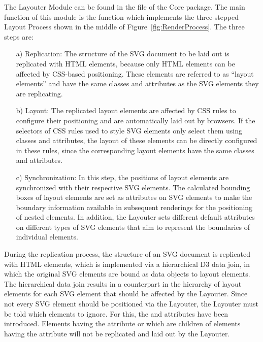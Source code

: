 The Layouter Module can be found in the  file of the
Core package. The main function of this module is the
 function which implements the three-stepped
Layout Process shown in the middle of
Figure~\ref{fig:RenderProcess}. The three steps are:
\begin{enumerate}
\item[a)] Replication: The structure of the SVG document to be laid
  out is replicated with HTML  elements, because only
  HTML elements can be affected by CSS-based positioning. These
  elements are referred to as \enquote{layout elements} and have the
  same classes and  attributes as the SVG elements
  they are replicating.

\item[b)] Layout: The replicated layout elements are affected by CSS
  rules to configure their positioning and are automatically laid out
  by browsers. If the selectors of CSS rules used to style SVG
  elements only select them using classes and 
  attributes, the layout of these elements can be directly configured
  in these rules, since the corresponding layout elements have the
  same classes and  attributes.

\item[c)] Synchronization: In this step, the positions of layout
  elements are synchronized with their respective SVG elements. The
  calculated bounding boxes of layout elements are set as
   attributes on SVG elements to make the boundary
  information available in subsequent renderings for the positioning
  of nested elements. In addition, the Layouter sets different default
  attributes on different types of SVG elements that aim to represent
  the boundaries of individual elements.
\end{enumerate}


During the replication process, the structure of an SVG document is
replicated with HTML  elements, which is implemented via
a hierarchical D3 data join, in which the original SVG elements are
bound as data objects to layout elements. The hierarchical data join
results in a counterpart in the hierarchy of layout elements for each
SVG element that should be affected by the Layouter. Since
not every SVG element should be positioned via the Layouter,
the Layouter must be told which elements to ignore. For
this, the  and
 attributes have been
introduced. Elements having the 
attribute or which are children of elements having the
 attribute will not be
replicated and laid out by the Layouter.

